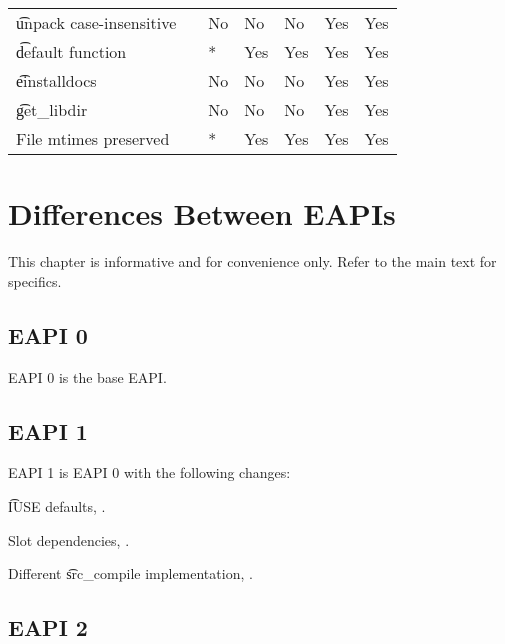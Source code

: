 \begin{landscape}
\begin{longtable}{llP{7.5em}P{7.5em}P{7.5em}P{7.5em}P{7.5em}}
\t{unpack} case-insensitive &  &
    No & No & No & Yes & Yes \\

\t{default} function &  &
    * & Yes & Yes & Yes & Yes \\

\t{einstalldocs} &  &
    No & No & No & Yes & Yes \\

\t{get_libdir} &  &
    No & No & No & Yes & Yes \\

File mtimes preserved &  &
    * & Yes & Yes & Yes & Yes \\

\end{longtable}
\end{landscape}

\chapter{Differences Between EAPIs}

\note This chapter is informative and for convenience only. Refer to the main text for specifics.

\section{EAPI 0}

EAPI 0 is the base EAPI.

\section{EAPI 1}

EAPI 1 is EAPI 0 with the following changes:

\begin{compactitem}
\item \t{IUSE} defaults, .
\item Slot dependencies, .
\item Different \t{src_compile} implementation, .
\end{compactitem}

\section{EAPI 2}

